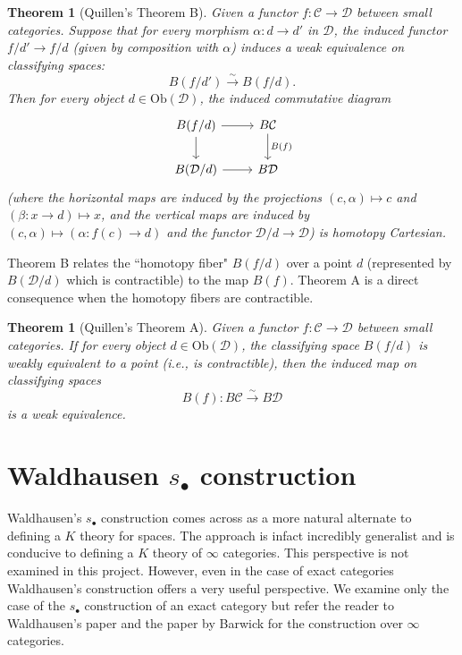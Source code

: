\documentclass[12pt]{report}
\numberwithin{equation}{section}
\newtheorem{theorem}[dummy]{Theorem}
\begin{document}
	\begin{theorem}[Quillen's Theorem B]
		\label{thm:quillen_B}
		Given a functor $f: \mathcal{C} \to \mathcal{D}$ between small categories. Suppose that for every morphism $\alpha: d \to d'$ in $\mathcal{D}$, the induced functor $f/d' \to f/d$ (given by composition with $\alpha$) induces a weak equivalence on classifying spaces:
		\[ B(f/d') \xrightarrow{\sim} B(f/d). \]
		Then for every object $d \in \mathrm{Ob}(\mathcal{D})$, the induced commutative diagram
		\[
		\begin{tikzcd}
			B(f/d) \arrow{r} \arrow{d} & B\mathcal{C} \arrow{d}{B(f)} \\
			B(\mathcal{D}/d) \arrow{r} & B\mathcal{D}
		\end{tikzcd}
		\]
		(where the horizontal maps are induced by the projections $(c, \alpha) \mapsto c$ and $(\beta: x \to d) \mapsto x$, and the vertical maps are induced by $(c, \alpha) \mapsto (\alpha: f(c) \to d)$ and the functor $\mathcal{D}/d \to \mathcal{D}$) is homotopy Cartesian.
	\end{theorem}
	
	Theorem B relates the ``homotopy fiber" $B(f/d)$ over a point $d$ (represented by $B(\mathcal{D}/d)$ which is contractible) to the map $B(f)$. Theorem A is a direct consequence when the homotopy fibers are contractible.
	
	\begin{theorem}[Quillen's Theorem A]
		\label{thm:quillen_A}
		Given a functor $f: \mathcal{C} \to \mathcal{D}$ between small categories. If for every object $d \in \mathrm{Ob}(\mathcal{D})$, the classifying space $B(f/d)$ is weakly equivalent to a point (i.e., is contractible), then the induced map on classifying spaces
		\[ B(f): B\mathcal{C} \xrightarrow{\sim} B\mathcal{D} \]
		is a weak equivalence.
	\end{theorem}
	
	
	\chapter{Waldhausen \( s_\bullet \) construction}
	
	Waldhausen's \( s_\bullet \) construction comes across as a more natural alternate to defining a \( K \) theory for spaces. The approach is infact incredibly generalist and is conducive to defining a \( K \) theory of \( \infty \) categories. This perspective is not examined in this project. However, even in the case of exact categories Waldhausen's construction offers a very useful perspective. We examine only the case of the \( s_\bullet \) construction of an exact category but refer the reader to Waldhausen's paper \cite{10.1007/BFb0074449} and the paper by Barwick \cite{Barwick_2016} for the construction over \( \infty \) categories.
	
\end{document}
